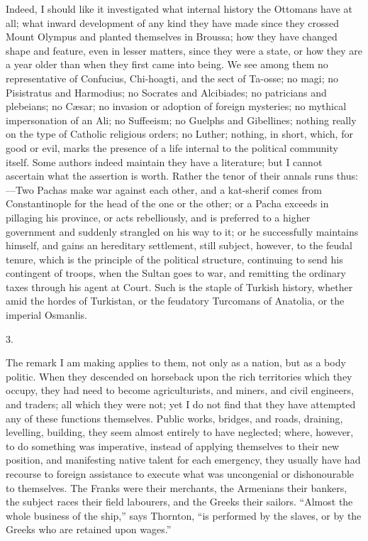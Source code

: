 Indeed, I should like it
investigated what internal history the Ottomans have at all; what
inward development of any kind they have made since they crossed Mount
Olympus and planted themselves in Broussa; how they have changed
shape and feature, even in lesser matters, since they were a state, or
how they are a year older than when they first came into being. We see
among them no representative of Confucius, Chi-hoagti, and the sect of
Ta-osse; no magi; no Pisistratus and Harmodius; no Socrates and
Alcibiades; no patricians and plebeians; no Cæsar; no invasion or
adoption of foreign mysteries; no mythical impersonation of an Ali; no
Suffeeism; no Guelphs and Gibellines; nothing really on the type of
Catholic religious orders; no Luther; nothing, in short, which, for
good or evil, marks the presence of a life internal to the political
community itself. Some authors indeed maintain they have a literature;
but I cannot ascertain what the assertion is worth. Rather the tenor
of their annals runs thus:—Two Pachas make war against each other,
and a kat-sherif comes from Constantinople for the head of the one or
the other; or a Pacha exceeds in pillaging his province, or acts
rebelliously, and is preferred to a higher government and suddenly
strangled on his way to it; or he successfully maintains himself, and
gains an hereditary settlement, still subject, however, to the feudal
tenure, which is the principle of the political structure, continuing
to send his contingent of troops, when the Sultan goes to war, and
remitting the ordinary taxes through his agent at Court. Such is the
staple of Turkish history, whether amid the hordes of Turkistan, or
the feudatory Turcomans of Anatolia, or the imperial Osmanlis.

3.

The remark I am making applies
to them, not only as a nation, but as a body politic. When they
descended on horseback upon the rich territories which they occupy,
they had need to become agriculturists, and miners, and civil
engineers, and traders; all which they were not; yet I do not find
that they have attempted any of these functions themselves. Public
works, bridges, and roads, draining, levelling, building, they seem
almost entirely to have neglected; where, however, to do something was
imperative, instead of applying themselves to their new position, and
manifesting native talent for each emergency, they usually have had
recourse to foreign assistance to execute what was uncongenial or
dishonourable to themselves. The Franks were their merchants, the
Armenians their bankers, the subject races their field labourers, and
the Greeks their sailors. ``Almost the whole business of the ship,''
says Thornton, ``is performed by the slaves, or by the Greeks who are
retained upon wages.''

